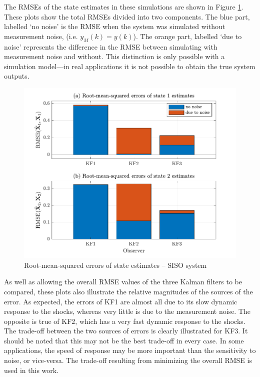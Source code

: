 The RMSEs of the state estimates in these simulations are shown in Figure \ref{fig:rod-obs-sim1-KF123-xest-RMSE-bar}. These plots show the total RMSEs divided into two components. The blue part, labelled `no noise' is the RMSE when the system was simulated without measurement noise, (i.e. $y_M(k)=y(k)$). The orange part, labelled `due to noise' represents the difference in the RMSE between simulating with measurement noise and without. This distinction is only possible with a simulation model---in real applications it is not possible to obtain the true system outputs.
\begin{figure}[htp]
	\centering
	\includegraphics[width=12cm]{images/rod_obs_sim1_all_seed_x_err_bar_KF123.pdf}
	\caption{Root-mean-squared errors of state estimates – SISO system}
	\label{fig:rod-obs-sim1-KF123-xest-RMSE-bar}
\end{figure}

As well as allowing the overall RMSE values of the three Kalman filters to be compared, these plots also illustrate the relative magnitudes of the sources of the error. As expected, the errors of KF1 are almost all due to its slow dynamic response to the shocks, whereas very little is due to the measurement noise. The opposite is true of KF2, which has a very fast dynamic response to the shocks. The trade-off between the two sources of errors is clearly illustrated for KF3. It should be noted that this may not be the best trade-off in every case. In some applications, the speed of response may be more important than the sensitivity to noise, or vice-versa. The trade-off resulting from minimizing the overall RMSE is used in this work.

